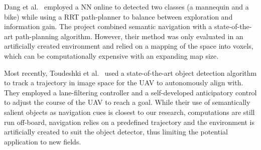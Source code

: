 \documentclass[a4paper,11pt]{article}
\theoremstyle{mytheor}
\begin{document}
Dang et al.~\cite{dang_autonomous_2018} employed a NN online to detected two classes (a mannequin and a bike) while using a RRT path-planner to balance between exploration and information gain. The project combined semantic navigation with a state-of-the-art path-planning algorithm. However, their method was only evaluated in an artificially created environment and relied on a mapping of the space into voxels, which can be computationally expensive with an expanding map size.

Most recently, Toudeshki et al.~\cite{toudeshki_robust_2018} used a state-of-the-art object detection algorithm to track a trajectory in image space for the UAV to autonomously align with. They employed a lane-filtering controller and a self-developed anticipatory control to adjust the course of the UAV to reach a goal. While their use of semantically salient objects as navigation cues is closest to our research, computations are still run off-board, navigation relies on a predefined trajectory and the environment is artificially created to suit the object detector, thus limiting the potential application to new fields.



\end{document}
